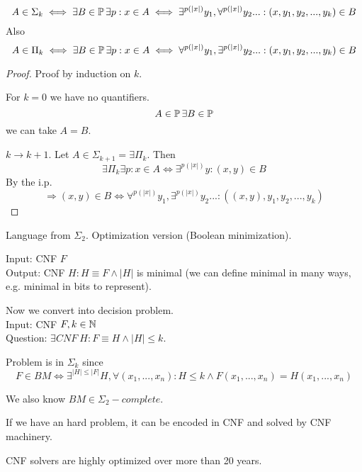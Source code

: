 \begin{consequence}
	\[ A \in \Sigma_k \iff \exists B \in \operatorname{\mathbb{P}} \exists p: x \in A \iff \exists^{p(|x|)} y_1, \forall^{p(|x|)} y_2 ... : (x, y_1, y_2, ..., y_k) \in B \]
	Also
	\[ A \in \Pi_k \iff \exists B \in \operatorname{\mathbb{P}} \exists p: x \in A \iff \forall^{p(|x|)} y_1, \exists^{p(|x|)} y_2 ... : (x, y_1, y_2, ..., y_k) \in B \]
\end{consequence}
\begin{proof}
	Proof by induction on $k$.

	For $k = 0$ we have no quantifiers.
	\[ A \in \operatorname{\mathbb{P}} \exists B \in \operatorname{\mathbb{P}} \]
	we can take $A = B$.

	$k \to k + 1$. Let $A \in \Sigma_{k + 1} = \exists \Pi_k$.
	Then
	\[ \exists \Pi_k \exists p: x \in A \iff \exists^{p(|x|)} y: (x,y) \in B \]
	By the i.p.
	\[ \Rightarrow (x,y) \in B \iff \forall^{p(|x|)} y_1, \exists^{p(|x|)} y_2 ... : ((x,y), y_1, y_2, ..., y_k) \]
\end{proof}

\begin{example}
	Language from $\Sigma_2$.
	Optimization version (Boolean minimization).

	Input: CNF $F$\\
	Output: CNF $H: H \equiv F \land |H|$ is minimal (we can define minimal in many ways, e.g. minimal in bits to represent).

	Now we convert into decision problem.\\
	Input: CNF $F, k \in \operatorname{\mathbb{N}}$ \\
	Question: $\exists CNF\ H: F \equiv H \land |H| \leq k $.

	Problem is in $\Sigma_k$ since
	\[ F \in BM \iff \exists^{|H| \leq |F|} H, \forall (x_1, ..., x_n): H \leq k \land F(x_1, ..., x_n) = H(x_1, ..., x_n) \]

	We also know $BM \in \Sigma_2-complete$.
\end{example}

\begin{note}
	If we have an hard problem, it can be encoded in CNF and solved by CNF machinery.

	CNF solvers are highly optimized over more than 20 years.
\end{note}

